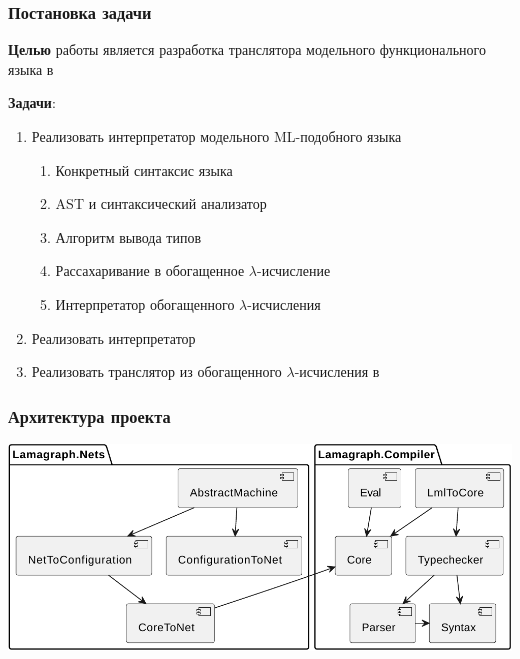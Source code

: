 \documentclass
  [ russian
  , aspectratio=169 %
  ] {beamer}
\begin{document}
\begin{frame}
    \frametitle{Постановка задачи}

    \textbf{Целью} работы является разработка транслятора модельного функционального языка в \INs{}
    \vspace{1em}

    \textbf{Задачи}:
    \begin{enumerate}
        \item Реализовать интерпретатор модельного ML-подобного языка
              \begin{enumerate}
                  \item Конкретный синтаксис языка
                  \item AST и синтаксический анализатор
                  \item Алгоритм вывода типов
                  \item Рассахаривание в обогащенное $\lambda$-исчисление
                  \item Интерпретатор обогащенного $\lambda$-исчисления
              \end{enumerate}
        \item Реализовать интерпретатор \INs{}
        \item Реализовать транслятор из обогащенного $\lambda$-исчисления в \INs{}
    \end{enumerate}

\end{frame}

\begin{frame}
    \frametitle{Архитектура проекта}

    \begin{center}
        \includegraphics[width=\linewidth]{figures/components.pdf}
    \end{center}

\end{frame}
\end{document}
